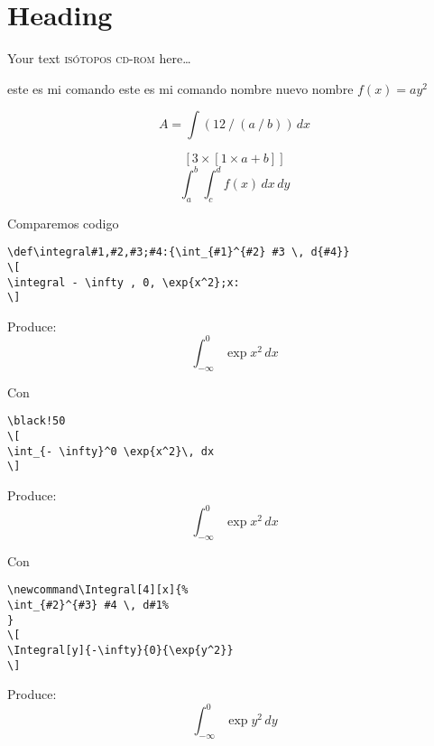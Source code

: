 \documentclass[11pt]{article}
\def\hola#1;{este es mi comando #1}
\def\division#1,#2:{\left(#1 \mathbin{/} #2\right)}
\def\multiplica#1,#2:{\left[#1\times #2\right]}
\def\integral#1,#2,#3;#4:{\int_{#1} ^{#2} #3 \,  d#4}
\begin{document}
\selectfont

\section{\textsf{Heading}}

\textsf{Your text \textsc{isótopos cd-rom} here…}

%
%

\hola \hola nombre; nuevo nombre; $f(x) = ay^2$

\[ 
 A = \int \division 12,\division a, b:: \, dx
\]

\[
\multiplica 3, \multiplica 1,a+b::
\] 
\[
\integral a, b, \integral c,d, f(x) ;x: ; y:
\] 


Comparemos codigo 
\begin{verbatim} 
\def\integral#1,#2,#3;#4:{\int_{#1}^{#2} #3 \, d{#4}} 
\[
\integral - \infty , 0, \exp{x^2};x:
\] 
\end{verbatim} 

Produce:
\[
\integral - \infty , 0, \exp{ x^2};x:
\] 

Con 
\begin{verbatim}\black!50
\[
\int_{- \infty}^0 \exp{x^2}\, dx
\] 
\end{verbatim} 

Produce:
\[
\int_{- \infty}^0 \exp{ x^2}\, dx
\]

Con 
{
\color{black!90}
\begin{verbatim} 
\newcommand\Integral[4][x]{%
\int_{#2}^{#3} #4 \, d#1%
} 
\[
\Integral[y]{-\infty}{0}{\exp{y^2}} 
\] 
\end{verbatim} }

Produce:
\newcommand{\Integral}[4][x]{%
\int_{#2}^{#3} #4 \, d#1%
} 
\[
\Integral[y]{-\infty}{0}{\exp{y^2}} 
\] 
\end{document}
